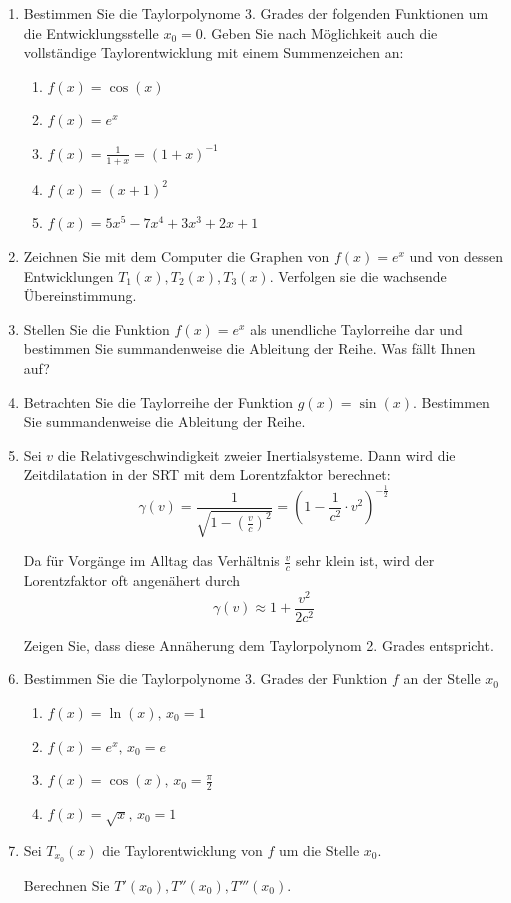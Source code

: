 \begin{ueb}
	{}{}

	\begin{enumerate}
		\item Bestimmen Sie die Taylorpolynome 3. Grades der folgenden Funktionen um die Entwicklungsstelle $x_0=0$. Geben Sie nach Möglichkeit auch die vollständige Taylorentwicklung mit einem Summenzeichen an:
		      \begin{enumerate}
			      \item $f(x) = \cos(x)$
			      \item $f(x)= e^x$
			      \item $f(x)= \frac{1}{1+x}=(1+x)^{-1}$
			      \item $f(x)= (x+1)^2$
			      \item $f(x)= 5x^5-7x^4+3x^3+2x+1$
		      \end{enumerate}
		\item Zeichnen Sie mit dem Computer die Graphen von $f(x)=e^x$ und von dessen Entwicklungen $T_1 (x),T_2 (x),T_3 (x)$. Verfolgen sie die wachsende Übereinstimmung.
		\item Stellen Sie die Funktion $f(x)=e^x$ als unendliche Taylorreihe dar und bestimmen Sie summandenweise die Ableitung der Reihe. Was fällt Ihnen auf?
		\item 	Betrachten Sie die Taylorreihe der Funktion $g(x)=\sin(x)$. Bestimmen Sie summandenweise die Ableitung der Reihe.
		\item Sei $v$ die Relativgeschwindigkeit zweier Inertialsysteme. Dann wird die Zeitdilatation in der SRT mit dem Lorentzfaktor berechnet:
		      \[
			      \gamma(v) = \frac{1}{\sqrt{1 - \left(\frac{v}{c}\right)^2}} = \left(1 - \frac{1}{c^2}\cdot v^2\right)^{-\frac{1}{2}}
		      \]

		      Da für Vorgänge im Alltag das Verhältnis \( \frac{v}{c} \) sehr klein ist, wird der Lorentzfaktor oft angenähert durch
		      \[
			      \gamma(v) \approx 1 + \frac{v^2}{2c^2}
		      \]

		      Zeigen Sie, dass diese Annäherung dem Taylorpolynom 2. Grades entspricht.
		      \pagebreak

		\item 	Bestimmen Sie die Taylorpolynome 3. Grades der Funktion $f$ an der Stelle $x_0$
		      \begin{enumerate}
			      \item $f(x) = \ln(x),\, x_0 = 1$
			      \item $f(x) = e^x,\, x_0 = e$
			      \item $f(x) = \cos(x),\, x_0 = \frac{\pi}{2}$
			      \item $f(x) = \sqrt{x},\, x_0 = 1$
		      \end{enumerate}
		\item 	Sei $T_{x_0}  (x)$ die Taylorentwicklung von $f$ um die Stelle $x_0$.

		      Berechnen Sie $T'(x_0 ),T'' (x_0 ),T'''(x_0 )$.
	\end{enumerate}
\end{ueb}
\clearpage

